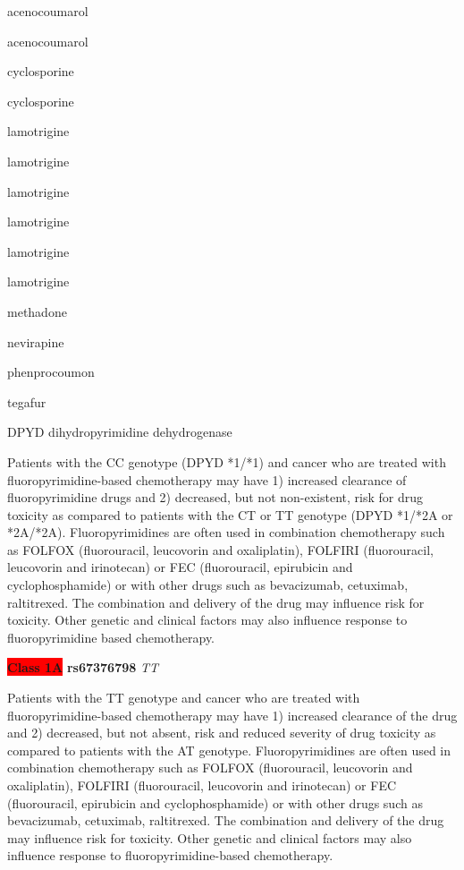 \documentclass{resume} %
\begin{document}
\begin{rSection}{ acenocoumarol }
\begin{rSection}{ acenocoumarol }
\begin{rSection}{ cyclosporine }
\begin{rSection}{ cyclosporine }
\begin{rSection}{ lamotrigine }
\begin{rSection}{ lamotrigine }
\begin{rSection}{ lamotrigine }
\begin{rSection}{ lamotrigine }
\begin{rSection}{ lamotrigine }
\begin{rSection}{ lamotrigine }
\begin{rSection}{ methadone }
\begin{rSection}{ nevirapine }
\begin{rSection}{ phenprocoumon }
\begin{rSection}{ tegafur }
\begin{rSubsection}{ DPYD }{ dihydropyrimidine dehydrogenase }{}{}
\item[] Patients with the CC genotype (DPYD *1/*1) and cancer who are treated with fluoropyrimidine-based chemotherapy may have 1) increased clearance of fluoropyrimidine drugs and 2) decreased, but not non-existent, risk for drug toxicity as compared to patients with the CT or TT genotype (DPYD *1/*2A or *2A/*2A). Fluoropyrimidines are often used in combination chemotherapy such as FOLFOX (fluorouracil, leucovorin and oxaliplatin), FOLFIRI (fluorouracil,  leucovorin and irinotecan) or FEC (fluorouracil, epirubicin and cyclophosphamide) or with other drugs such as bevacizumab, cetuximab, raltitrexed. The combination and delivery of the drug may influence risk for toxicity. Other genetic and clinical factors may also influence response to fluoropyrimidine based chemotherapy.\item \textbf{\colorbox{red} {Class 1A}} \textbf{ rs67376798 } \textit{ TT }
\item[] Patients with the TT genotype and cancer who are treated with fluoropyrimidine-based chemotherapy may have 1) increased clearance of the drug and 2) decreased, but not absent, risk and reduced severity of drug toxicity as compared to patients with the AT genotype. Fluoropyrimidines are often used in combination chemotherapy such as FOLFOX (fluorouracil, leucovorin and oxaliplatin), FOLFIRI (fluorouracil, leucovorin and irinotecan) or FEC (fluorouracil, epirubicin and cyclophosphamide) or with other drugs such as bevacizumab, cetuximab, raltitrexed. The combination and delivery of the drug may influence risk for toxicity. Other genetic and clinical factors may also influence response to fluoropyrimidine-based chemotherapy.

\end{rSubsection}


\end{rSection}
\end{rSection}
\end{rSection}
\end{rSection}
\end{rSection}
\end{rSection}
\end{rSection}
\end{rSection}
\end{rSection}
\end{rSection}
\end{rSection}
\end{rSection}
\end{rSection}
\end{rSection}
\end{document}

